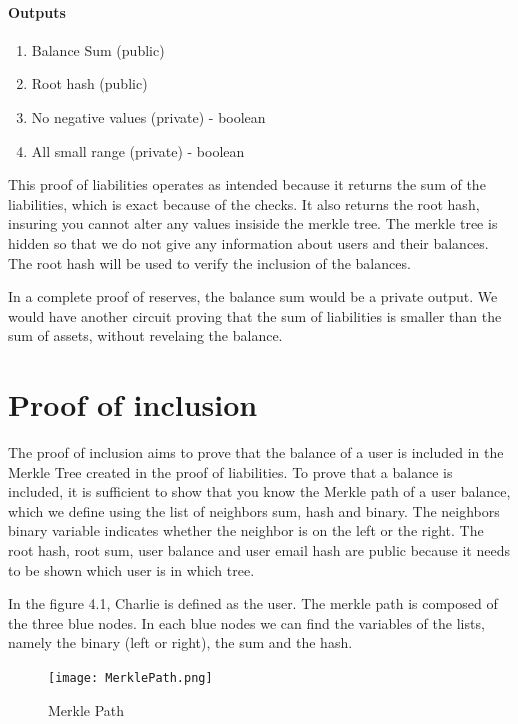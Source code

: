 \paragraph{Outputs}
\begin{enumerate}
    \item Balance Sum (public)
    \item Root hash (public)
    \item No negative values (private) - boolean
    \item All small range (private) - boolean
    \end{enumerate}

This proof of liabilities operates as intended because it returns the sum of the liabilities, which is exact because of the checks. 
It also returns the root hash, insuring you cannot alter any values insiside the merkle tree. The merkle tree is hidden so that we do not
give any information about users and their balances.
The root hash will be used to verify the inclusion of the balances.


In a complete proof of reserves, the balance sum would be a private output. We would have another circuit proving that the sum of liabilities is smaller
than the sum of assets, without revelaing the balance.


\section{Proof of inclusion} 
\label{subsec:pi}
The proof of inclusion aims to prove that the balance of a user is included in the Merkle Tree created in the proof of liabilities.
To prove that a balance is included, it is sufficient to show that you know the Merkle path of a user balance,
which we define using the list of neighbors sum, hash and binary. 
The neighbors binary variable indicates whether the neighbor is on the left or the right. 
The root hash, root sum, user balance and user email hash are public because it needs to be shown which user is in which tree.

In the figure 4.1, Charlie is defined as the user. The merkle path is composed of the three blue nodes. In each blue nodes we can find the variables of the lists,
namely the binary (left or right), the sum and the hash.
\begin{figure}[H]
    \centering
    \texttt{[image: MerklePath.png]}
    \caption{Merkle Path \cite{BM22}}
    \label{overflow}
    \end{figure}

